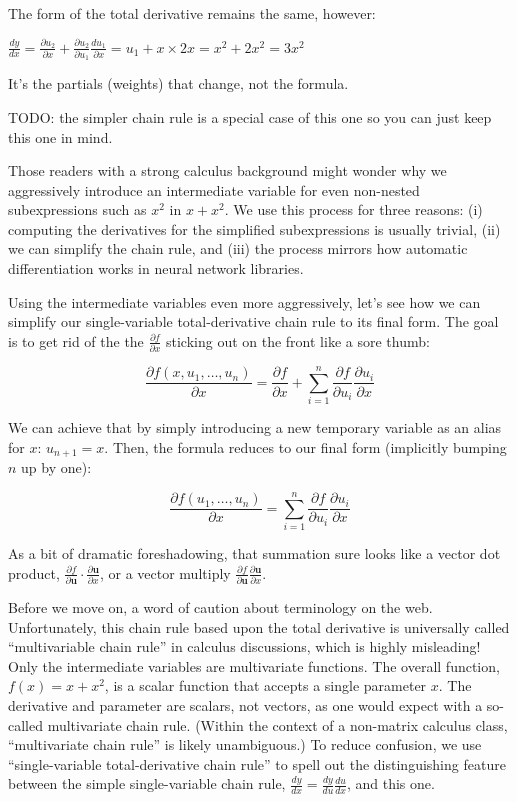 \documentclass[11pt]{article}
\begin{document}
The form of the total derivative remains the same, however:

$\frac{dy}{dx} = \frac{\partial u_2}{\partial x} + \frac{\partial u_2}{\partial u_1}\frac{d u_1}{\partial  x} = u_1 + x \times 2x = x^2 + 2x^2 = 3x^2$

It's the partials (weights) that change, not the formula.

TODO: the simpler chain rule is a special case of this one so you can just keep this one in mind.

Those readers with a strong calculus background might wonder why we aggressively introduce an intermediate variable for even non-nested subexpressions such as $x^2$ in $x+x^2$. We use this process for three reasons: (i) computing the derivatives for the simplified subexpressions is usually trivial, (ii) we can simplify the chain rule, and (iii) the process mirrors how automatic differentiation works in neural network libraries.

Using the intermediate variables even more aggressively, let's see how we can simplify our single-variable total-derivative chain rule to its final form. The goal is to get rid of the the $\frac{\partial f}{\partial x}$ sticking out on the front like a sore thumb:

\[
\frac{\partial f(x,u_1,\ldots,u_n)}{\partial x} = \frac{\partial f}{\partial x} + \sum_{i=1}^n \frac{\partial f}{\partial u_i}\frac{\partial  u_i}{\partial  x}
\]

We can achieve that by simply introducing a new temporary variable as an alias for $x$: $u_{n+1} = x$. Then, the formula reduces to our final form (implicitly bumping $n$ up by one):

\[
\frac{\partial f(u_1,\ldots,u_n)}{\partial x} = \sum_{i=1}^n \frac{\partial f}{\partial u_i}\frac{\partial  u_i}{\partial  x}
\]

As a bit of dramatic foreshadowing, that summation sure looks like a vector dot product, $\frac{\partial f}{\partial \mathbf{u}} \cdot \frac{\partial \mathbf{u}}{\partial x}$, or  a vector multiply $\frac{\partial f}{\partial \mathbf{u}} \frac{\partial \mathbf{u}}{\partial x}$.
 

Before we move on, a word of caution about terminology on the web. Unfortunately, this chain rule based upon the total derivative is universally called ``multivariable chain rule'' in calculus discussions, which is highly misleading! Only the intermediate variables are multivariate functions. The overall function, $f(x) = x + x^2$, is a scalar function that accepts a single parameter $x$. The derivative and parameter are scalars, not vectors, as one would expect with a so-called multivariate chain rule.  (Within the context of a non-matrix calculus class, ``multivariate chain rule'' is likely unambiguous.) To reduce confusion, we use ``single-variable total-derivative chain rule'' to spell out the distinguishing feature between the simple single-variable chain rule, $\frac{dy}{dx} = \frac{dy}{du}\frac{du}{dx}$, and this one. 
\end{document}
